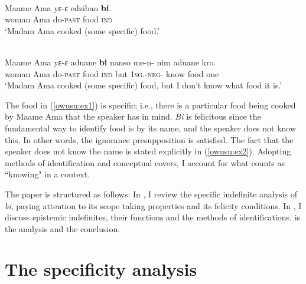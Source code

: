\documentclass[output=paper,modfonts,nonflat,draftmode]{langsci/langscibook}
\begin{document}
\ea 
{}\\
\ea\label{owusu:ex1}

\gll Maame Ama yε-ε edziban \textbf{bi}. \\
     woman Ama do-\textsc{past} food  \textsc{ind}   \\
\glt `Madam Ama cooked (some specific) food.'

\ex\label{owusu:ex2}
\\
\gll  Maame Ama yε-ε aduane \textbf{bi} nanso me-n- nim aduane kro. \\
     woman Ama do-\textsc{past} food  \textsc{ind} but \textsc{1sg.}-\textsc{neg}- know food one \\ 
     \glt `Madam Ama cooked (some specific) food, but I don't know what food it is.'
     
\z \z 

The food in (\ref{owusu:ex1}) is specific; i.e., there is a particular food being cooked by Maame Ama that the speaker has in mind. \emph{Bi} is felicitous since the fundamental way to identify food is by its name, and the speaker does not know this. In other words, the ignorance presupposition is satisfied. The fact that the speaker does not know the name is stated explicitly in (\ref{owusu:ex2}). Adopting \citet{AloniPort2015} methods of identification and conceptual covers, I account for what counts as ``knowing" in a context.

The paper is structured as follows: In , I review the specific indefinite analysis of \emph{bi}, paying attention to its scope taking properties and its felicity conditions. In , I discuss epistemic indefinites, their functions and the methods of identifications.   is the analysis and  the conclusion.  


\section{The specificity analysis}\label{sec:owusu:2}
 
\end{document}
